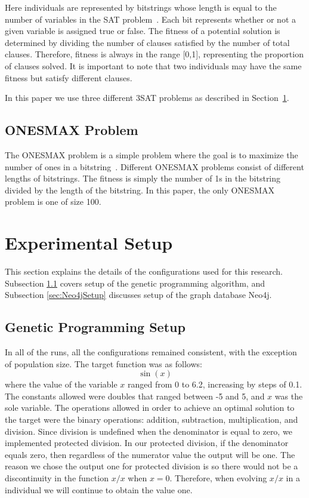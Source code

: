 \documentclass[12pt]{article}
\begin{document}
Here individuals are represented by bitstrings whose length is equal to the number of variables in the SAT problem~\cite{Gottlieb:2002:EAS:638548.638550}. Each bit represents whether or not a given variable is assigned true or false. The fitness of a potential solution is determined by dividing the number of clauses satisfied by the number of total clauses. Therefore, fitness is always in the range [0,1], representing the proportion of clauses solved. It is important to note that two individuals may have the same fitness but satisfy different clauses.

In this paper we use three different 3SAT problems as described in Section~\ref{sec:experiments}.


\subsection{ONESMAX Problem}
\label{sec:ONESMAX}

The ONESMAX problem is a simple problem where the goal is to maximize the number of ones in a bitstring~\cite{Alba:2008}. Different ONESMAX problems consist of different lengths of bitstrings. The fitness is simply the number of 1s in the bitstring divided by the length of the bitstring. In this paper, the only ONESMAX problem is one of size 100.

\section{Experimental Setup} 
\label{sec:experiments}

This section explains the details of the configurations used for this research. Subsection \ref{sec:GPSetup} covers setup of the genetic programming algorithm, and Subsection \ref{sec:Neo4jSetup} discusses setup of the graph database Neo4j.

\subsection{Genetic Programming Setup}
\label{sec:GPSetup}

In all of the runs, all the configurations remained consistent, with the exception of population size. The target function was as follows:
\[
	\sin(x)
\]
where the value of the variable $x$ ranged from 0 to 6.2, increasing by steps of 0.1. The constants allowed were doubles that ranged between -5 and 5, and $x$ was the sole variable. The operations allowed in order to achieve an optimal solution to the target were the binary operations: addition, subtraction, multiplication, and division. Since division is undefined when the denominator is equal to zero, we implemented protected division. In our protected division, if the denominator equals zero, then regardless of the numerator value the output will be one. The reason we chose the output one for protected division is so there would not be a discontinuity in the function $x/x$ when $x = 0$. Therefore, when evolving $x/x$ in a individual we will continue to obtain the value one.
\end{document}
